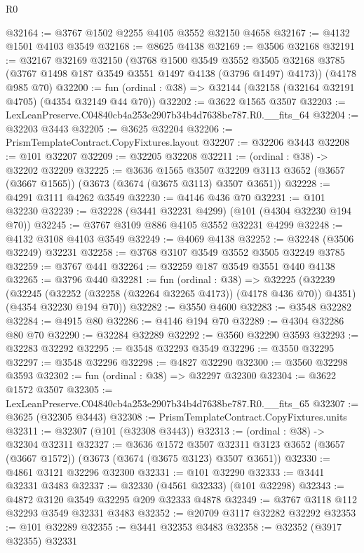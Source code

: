 \begin{lexlean}{R0}
\begin{coremodule}
@32164 := @3767 @1502 @2255 @4105 @3552 @32150 @4658
@32167 := @4132 @1501 @4103 @3549
@32168 := @8625 @4138
@32169 := @3506 @32168
@32191 := @32167
    @32169
    @32150
    (@3768
      @1500
      @3549
      @3552
      @3505
      @32168
      @3785
      (@3767 @1498 @187 @3549 @3551 @1497 @4138 (@3796 @1497) @4173))
    (@4178 @985 @70)
@32200 := fun (ordinal : @38) => @32144 (@32158 (@32164 @32191 @4705) (@4354 @32149 @44 @70))
@32202 := @3622 @1565 @3507
@32203 := LexLeanPreserve.C04840cb4a253e2907b34b4d7638be787.R0.__fits_64
@32204 := @32203 @3443
@32205 := @3625 @32204
@32206 := PrismTemplateContract.CopyFixtures.layout
@32207 := @32206 @3443
@32208 := @101 @32207
@32209 := @32205 @32208
@32211 := (ordinal : @38) -> @32202 @32209
@32225 := @3636
    @1565
    @3507
    @32209
    @3113
    @3652
    (@3657 (@3667 @1565))
    (@3673 (@3674 (@3675 @3113) @3507 @3651))
@32228 := @4291 @3111 @4262 @3549
@32230 := @4146 @436 @70
@32231 := @101 @32230
@32239 := @32228 (@3441 @32231 @4299) (@101 (@4304 @32230 @194 @70))
@32245 := @3767 @3109 @886 @4105 @3552 @32231 @4299
@32248 := @4132 @3108 @4103 @3549
@32249 := @4069 @4138
@32252 := @32248 (@3506 @32249) @32231
@32258 := @3768 @3107 @3549 @3552 @3505 @32249 @3785
@32259 := @3767 @441
@32264 := @32259 @187 @3549 @3551 @440 @4138
@32265 := @3796 @440
@32281 := fun (ordinal : @38) =>
  @32225
    (@32239
      (@32245 (@32252 (@32258 (@32264 @32265 @4173)) (@4178 @436 @70)) @4351)
      (@4354 @32230 @194 @70))
@32282 := @3550 @4600
@32283 := @3548 @32282
@32284 := @4915 @80
@32286 := @4146 @194 @70
@32289 := @4304 @32286 @80 @70
@32290 := @32284 @32289
@32292 := @3560 @32290 @3593
@32293 := @32283 @32292
@32295 := @3548 @32293 @3549
@32296 := @3550 @32295
@32297 := @3548 @32296
@32298 := @4827 @32290
@32300 := @3560 @32298 @3593
@32302 := fun (ordinal : @38) => @32297 @32300
@32304 := @3622 @1572 @3507
@32305 := LexLeanPreserve.C04840cb4a253e2907b34b4d7638be787.R0.__fits_65
@32307 := @3625 (@32305 @3443)
@32308 := PrismTemplateContract.CopyFixtures.units
@32311 := @32307 (@101 (@32308 @3443))
@32313 := (ordinal : @38) -> @32304 @32311
@32327 := @3636
    @1572
    @3507
    @32311
    @3123
    @3652
    (@3657 (@3667 @1572))
    (@3673 (@3674 (@3675 @3123) @3507 @3651))
@32330 := @4861 @3121 @32296 @32300
@32331 := @101 @32290
@32333 := @3441 @32331 @3483
@32337 := @32330 (@4561 @32333) (@101 @32298)
@32343 := @4872 @3120 @3549 @32295 @209 @32333 @4878
@32349 := @3767 @3118 @112 @32293 @3549 @32331 @3483
@32352 := @20709 @3117 @32282 @32292
@32353 := @101 @32289
@32355 := @3441 @32353 @3483
@32358 := @32352 (@3917 @32355) @32331

\end{coremodule}
\end{lexlean}
